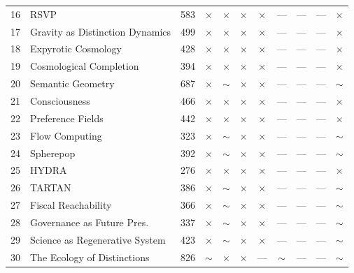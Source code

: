 \documentclass[11pt]{report}
\newcommand{\statusgap}{\textcolor{red!70!black}{$\times$}}
\newcommand{\statuspartial}{\textcolor{orange!80!black}{$\sim$}}
\begin{document}
\begin{longtable}{@{}p{0.5cm}p{4.3cm}p{1.3cm}cccccccc@{}}
16 & RSVP                             & 583 & \statusgap & \statusgap & \statusgap & \statusgap & --- & --- & --- & \statusgap \\
17 & Gravity as Distinction Dynamics  & 499 & \statusgap & \statusgap & \statusgap & \statusgap & --- & --- & --- & \statusgap \\
18 & Expyrotic Cosmology              & 428 & \statusgap & \statusgap & \statusgap & \statusgap & --- & --- & --- & \statusgap \\
19 & Cosmological Completion          & 394 & \statusgap & \statusgap & \statusgap & \statusgap & --- & --- & --- & \statusgap \\
20 & Semantic Geometry                & 687 & \statusgap & \statuspartial & \statusgap & \statusgap & --- & --- & --- & \statuspartial \\
21 & Consciousness                    & 466 & \statusgap & \statusgap & \statusgap & \statusgap & --- & --- & --- & \statusgap \\
22 & Preference Fields                & 442 & \statusgap & \statusgap & \statusgap & \statusgap & --- & --- & --- & \statusgap \\
23 & Flow Computing                   & 323 & \statusgap & \statuspartial & \statusgap & \statusgap & --- & --- & --- & \statuspartial \\
24 & Spherepop                        & 392 & \statusgap & \statuspartial & \statusgap & \statusgap & --- & --- & --- & \statuspartial \\
25 & HYDRA                            & 276 & \statusgap & \statusgap & \statusgap & \statusgap & --- & --- & --- & \statusgap \\
26 & TARTAN                           & 386 & \statusgap & \statuspartial & \statusgap & \statusgap & --- & --- & --- & \statuspartial \\
27 & Fiscal Reachability              & 366 & \statusgap & \statuspartial & \statusgap & \statusgap & --- & --- & --- & \statuspartial \\
28 & Governance as Future Pres.\      & 337 & \statusgap & \statuspartial & \statusgap & \statusgap & --- & --- & --- & \statuspartial \\
29 & Science as Regenerative System   & 423 & \statusgap & \statuspartial & \statusgap & \statusgap & --- & --- & --- & \statuspartial \\
30 & The Ecology of Distinctions      & 826 & \statuspartial & \statusgap & \statusgap & --- & \statuspartial & --- & --- & \statuspartial \\

\end{longtable}
\end{document}
